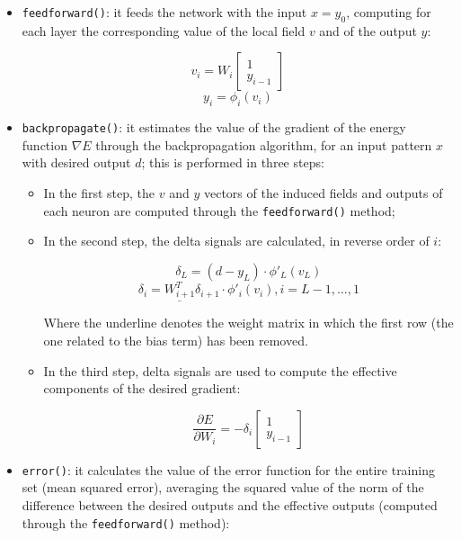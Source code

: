 \documentclass[letterpaper,headings=standardclasses]{scrartcl}
\begin{document}
\begin{itemize}

    \item \texttt{feedforward()}: it feeds the network with the input $x = y_0$, computing for each layer the corresponding value of the local field $v$ and of the output $y$:
    
    $$ v_i = W_i \left[ \begin{matrix} 1 \\ y_{i - 1} \end{matrix} \right] $$
    $$ y_i = \phi_i(v_i) $$
    
    \item \texttt{backpropagate()}: it estimates the value of the gradient of the energy function $\nabla E$ through the backpropagation algorithm, for an input pattern $x$ with desired output $d$; this is performed in three steps:
    
    \begin{itemize}

        \item In the first step, the $v$ and $y$ vectors of the induced fields and outputs of each neuron are computed through the \texttt{feedforward()} method;

        \item In the second step, the delta signals are calculated, in reverse order of $i$:
        
        $$ \delta_L = (d - y_L) \cdot \phi'_L(v_L) $$
        $$ \delta_i = \underline{W_{i + 1}^T} \delta_{i + 1} \cdot \phi'_i(v_i), i = L - 1, \dots, 1 $$

        Where the underline denotes the weight matrix in which the first row (the one related to the bias term) has been removed.

        \item In the third step, delta signals are used to compute the effective components of the desired gradient:
        
        $$ \frac{\partial E}{\partial W_i} = -\delta_i \left[ \begin{matrix} 1 \\ y_{i - 1} \end{matrix} \right] $$

    \end{itemize}
    
    \item \texttt{error()}: it calculates the value of the error function for the entire training set (mean squared error), averaging the squared value of the norm of the difference between the desired outputs and the effective outputs (computed through the \texttt{feedforward()} method):
    

\end{itemize}
\end{document}
